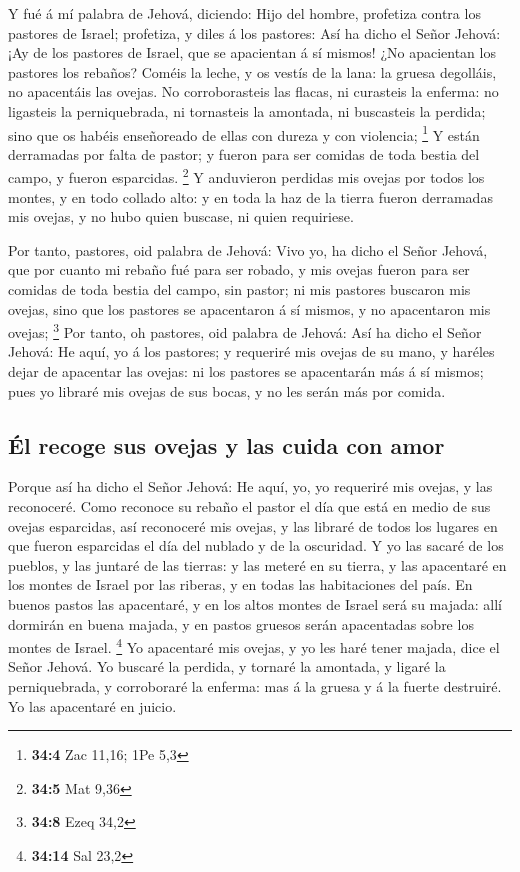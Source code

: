  Y fué á mí palabra de Jehová, diciendo:  Hijo
del hombre, profetiza contra los pastores de Israel; profetiza, y diles
á los pastores: Así ha dicho el Señor Jehová: ¡Ay de los pastores de
Israel, que se apacientan á sí mismos! ¿No apacientan los pastores los
rebaños?  Coméis la leche, y os vestís de la lana: la gruesa
degolláis, no apacentáis las ovejas.  No corroborasteis las
flacas, ni curasteis la enferma: no ligasteis la perniquebrada, ni
tornasteis la amontada, ni buscasteis la perdida; sino que os habéis
enseñoreado de ellas con dureza y con violencia; \footnote{\textbf{34:4}
  Zac 11,16; 1Pe 5,3}  Y están derramadas por falta de
pastor; y fueron para ser comidas de toda bestia del campo, y fueron
esparcidas. \footnote{\textbf{34:5} Mat 9,36}  Y anduvieron
perdidas mis ovejas por todos los montes, y en todo collado alto: y en
toda la haz de la tierra fueron derramadas mis ovejas, y no hubo quien
buscase, ni quien requiriese.

 Por tanto, pastores, oid palabra de Jehová: 
Vivo yo, ha dicho el Señor Jehová, que por cuanto mi rebaño fué para ser
robado, y mis ovejas fueron para ser comidas de toda bestia del campo,
sin pastor; ni mis pastores buscaron mis ovejas, sino que los pastores
se apacentaron á sí mismos, y no apacentaron mis ovejas; \footnote{\textbf{34:8}
  Ezeq 34,2}  Por tanto, oh pastores, oid palabra de Jehová:
 Así ha dicho el Señor Jehová: He aquí, yo á los pastores;
y requeriré mis ovejas de su mano, y haréles dejar de apacentar las
ovejas: ni los pastores se apacentarán más á sí mismos; pues yo libraré
mis ovejas de sus bocas, y no les serán más por comida.

\hypertarget{uxe9l-recoge-sus-ovejas-y-las-cuida-con-amor}{%
\subsection{Él recoge sus ovejas y las cuida con
amor}\label{uxe9l-recoge-sus-ovejas-y-las-cuida-con-amor}}

 Porque así ha dicho el Señor Jehová: He aquí, yo, yo
requeriré mis ovejas, y las reconoceré.  Como reconoce su
rebaño el pastor el día que está en medio de sus ovejas esparcidas, así
reconoceré mis ovejas, y las libraré de todos los lugares en que fueron
esparcidas el día del nublado y de la oscuridad.  Y yo las
sacaré de los pueblos, y las juntaré de las tierras: y las meteré en su
tierra, y las apacentaré en los montes de Israel por las riberas, y en
todas las habitaciones del país.  En buenos pastos las
apacentaré, y en los altos montes de Israel será su majada: allí
dormirán en buena majada, y en pastos gruesos serán apacentadas sobre
los montes de Israel. \footnote{\textbf{34:14} Sal 23,2} 
Yo apacentaré mis ovejas, y yo les haré tener majada, dice el Señor
Jehová.  Yo buscaré la perdida, y tornaré la amontada, y
ligaré la perniquebrada, y corroboraré la enferma: mas á la gruesa y á
la fuerte destruiré. Yo las apacentaré en juicio.

